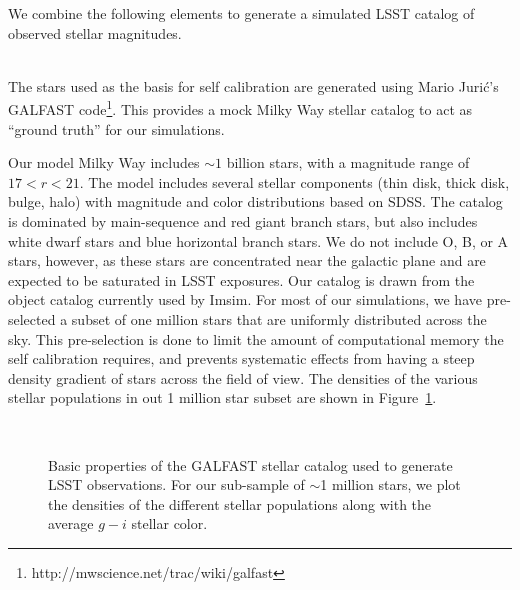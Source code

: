 \documentclass[12pt,preprint]{aastex}
\begin{document}
We combine the following elements to generate a simulated LSST catalog of observed stellar magnitudes.

\\
The stars used as the basis for self calibration are generated using Mario Juri\'{c}'s GALFAST code\footnote{ http://mwscience.net/trac/wiki/galfast}.  This provides a mock Milky Way stellar catalog to act as ``ground truth'' for our simulations.  

Our model Milky Way includes $\sim1$ billion stars, with a magnitude range of $17 < r < 21$.  The model includes several stellar components (thin disk, thick disk, bulge, halo) with magnitude and color distributions based on SDSS. The catalog is dominated by main-sequence and red giant branch stars, but also includes white dwarf stars and blue horizontal branch stars.  We do not include O, B, or A stars, however, as these stars are concentrated near the galactic plane and are expected to be saturated in LSST exposures.  Our catalog is drawn from the object catalog currently used by Imsim.  For most of our simulations, we have pre-selected a subset of one million stars that are uniformly distributed across the sky.  This pre-selection is done to limit the amount of computational memory the self calibration requires, and prevents systematic effects from having a steep density gradient of stars across the field of view.  The densities of the various stellar populations in out 1 million star subset are shown in Figure~\ref{fig:gfpop}.


\begin{figure}
\\
\caption{Basic properties of the GALFAST stellar catalog used to generate LSST observations.  For our sub-sample of $\sim$1 million stars, we plot the densities of the different stellar populations along with the average $g-i$ stellar color.\label{fig:gfpop}}
\end{figure}
\end{document}
